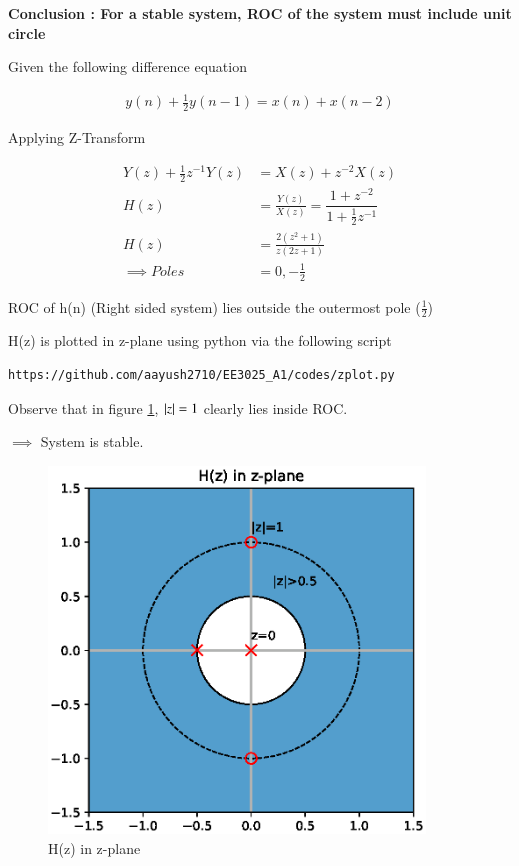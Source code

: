\documentclass[journal,12pt,twocolumn]{IEEEtran}
\begin{document}
\textbf{Conclusion : For a stable system, ROC of the system must include unit circle}

Given the following difference equation

\begin{align}
y(n) + \frac{1}{2} y(n-1) = x(n) + x(n-2)
\end{align}

Applying Z-Transform

\begin{align}
Y(z) + \frac{1}{2} z^{-1}Y(z) &= X(z) + z^{-2}X(z) \\
H(z) &= \frac{Y(z)}{X(z)} = \dfrac{1 + z^{-2}}{1 + \frac{1}{2} z^{-1}} \\
H(z) &= \frac{2(z^{2} +1)}{z(2z+1)} \\
\implies Poles &= 0 , -\frac{1}{2}
\end{align}

ROC of h(n) (Right sided system) lies outside the outermost pole ($\frac{1}{2}$)

H(z) is plotted in z-plane using python via the following script
\\
\begin{lstlisting}
https://github.com/aayush2710/EE3025_A1/codes/zplot.py
\end{lstlisting}

Observe that in figure \ref{Z_plane analysis}, $\left\vert z\right\vert = 1$ clearly lies inside ROC.

$\implies$ System is stable.


\begin{figure}[h!]
    \centering
    \includegraphics[width=10cm]{./figs/zplane.eps}
    \caption{H(z) in z-plane}
    \label{Z_plane analysis}
\end{figure}
\end{document}
